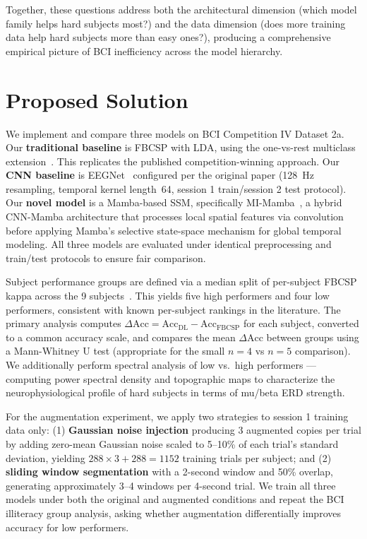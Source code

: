 \documentclass{article}
\begin{document}
Together, these questions address both the architectural dimension (which model family helps hard subjects most?) and the data dimension (does more training data help hard subjects more than easy ones?), producing a comprehensive empirical picture of BCI inefficiency across the model hierarchy.

\section{Proposed Solution}

We implement and compare three models on BCI Competition IV Dataset 2a. Our \textbf{traditional baseline} is FBCSP with LDA, using the one-vs-rest multiclass extension~\cite{ang2012filter}. This replicates the published competition-winning approach. Our \textbf{CNN baseline} is EEGNet~\cite{lawhern2018eegnet} configured per the original paper (128~Hz resampling, temporal kernel length~64, session 1 train/session 2 test protocol). Our \textbf{novel model} is a Mamba-based SSM, specifically MI-Mamba~\cite{guo2025mimamba}, a hybrid CNN-Mamba architecture that processes local spatial features via convolution before applying Mamba's selective state-space mechanism for global temporal modeling. All three models are evaluated under identical preprocessing and train/test protocols to ensure fair comparison.

Subject performance groups are defined via a median split of per-subject FBCSP kappa across the 9 subjects~\cite{nakanishi2022classification}. This yields five high performers and four low performers, consistent with known per-subject rankings in the literature. The primary analysis computes $\Delta\text{Acc} = \text{Acc}_\text{DL} - \text{Acc}_\text{FBCSP}$ for each subject, converted to a common accuracy scale, and compares the mean $\Delta\text{Acc}$ between groups using a Mann-Whitney U test (appropriate for the small $n=4$ vs $n=5$ comparison). We additionally perform spectral analysis of low vs.\ high performers --- computing power spectral density and topographic maps to characterize the neurophysiological profile of hard subjects in terms of mu/beta ERD strength.

For the augmentation experiment, we apply two strategies to session 1 training data only: (1) \textbf{Gaussian noise injection} producing 3 augmented copies per trial by adding zero-mean Gaussian noise scaled to 5--10\% of each trial's standard deviation, yielding $288 \times 3 + 288 = 1152$ training trials per subject; and (2) \textbf{sliding window segmentation} with a 2-second window and 50\% overlap, generating approximately 3--4 windows per 4-second trial. We train all three models under both the original and augmented conditions and repeat the BCI illiteracy group analysis, asking whether augmentation differentially improves accuracy for low performers.
\end{document}
